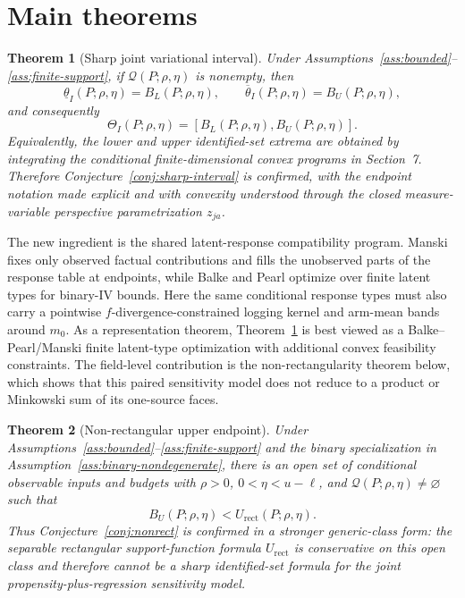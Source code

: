 \documentclass[11pt]{article}
\theoremstyle{definition}
\theoremstyle{plain}
\newtheorem{theorem}{Theorem}
\theoremstyle{remark}
\begin{document}
\section{Main theorems}
\begin{theorem}[Sharp joint variational interval]\label{thm:sharp}
Under Assumptions~\ref{ass:bounded}--\ref{ass:finite-support}, if
$\mathcal Q(P;\rho,\eta)$ is nonempty, then
\[
  \underline{\theta}_I(P;\rho,\eta)=B_L(P;\rho,\eta),\qquad
  \overline{\theta}_I(P;\rho,\eta)=B_U(P;\rho,\eta),
\]
and consequently
\[
  \Theta_I(P;\rho,\eta)=[B_L(P;\rho,\eta),B_U(P;\rho,\eta)].
\]
Equivalently, the lower and upper identified-set extrema are obtained by
integrating the conditional finite-dimensional convex programs in Section~7.
Therefore Conjecture~\ref{conj:sharp-interval} is confirmed, with the endpoint
notation made explicit and with convexity understood through the closed
measure-variable perspective parametrization $z_{ja}$.
\end{theorem}

The new ingredient is the shared latent-response compatibility program.  Manski
\cite{Manski1990} fixes only observed factual contributions and fills the
unobserved parts of the response table at endpoints, while Balke and Pearl
\cite{BalkePearl1997} optimize over finite latent types for binary-IV bounds.
Here the same conditional response types must also carry a pointwise
$f$-divergence-constrained logging kernel and arm-mean bands around $m_0$.
As a representation theorem, Theorem~\ref{thm:sharp} is best viewed as a
Balke--Pearl/Manski finite latent-type optimization with additional convex
feasibility constraints.  The field-level contribution is the
non-rectangularity theorem below, which shows that this paired sensitivity model
does not reduce to a product or Minkowski sum of its one-source faces.

\begin{theorem}[Non-rectangular upper endpoint]\label{thm:nonrect}
Under Assumptions~\ref{ass:bounded}--\ref{ass:finite-support} and the binary
specialization in Assumption~\ref{ass:binary-nondegenerate}, there is an open
set of conditional
observable inputs and budgets with $\rho>0$,
$0<\eta<u-\ell$, and $\mathcal Q(P;\rho,\eta)\ne\varnothing$ such that
\[
  B_U(P;\rho,\eta)<U_{\mathrm{rect}}(P;\rho,\eta).
\]
Thus Conjecture~\ref{conj:nonrect} is confirmed in a stronger generic-class
form: the separable rectangular support-function formula
$U_{\mathrm{rect}}$ is conservative on this open class and therefore cannot be
a sharp identified-set formula for the joint propensity-plus-regression
sensitivity model.
\end{theorem}
\end{document}
